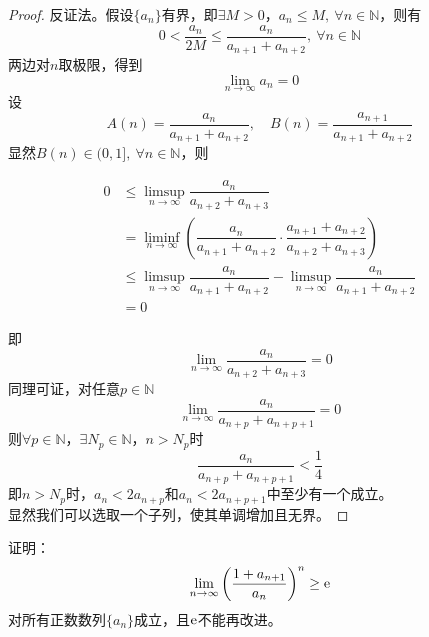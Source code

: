 \begin{proof}
    
    反证法。假设$\{a_n\}$有界，即$\exists M > 0$，$a_n \leq M,\ \forall n \in \mathbb{N}$，则有
    $$0 < \dfrac{a_n}{2M} \leq \dfrac{a_n}{a_{n+1} + a_{n+2}}, \ \forall n \in \mathbb{N}$$
    两边对$n$取极限，得到
    $$\lim\limits_{n\to\infty}{a_n} = 0$$
    设
    $$A(n) = \dfrac{a_n}{a_{n+1} + a_{n+2}}, \quad B(n) = \dfrac{a_{n+1}}{a_{n+1} + a_{n+2}}$$
    显然$B(n) \in (0,1],\  \forall n \in \mathbb{N}$，则
    
    \begin{align*}
        0 & \leq \limsup_{n\to\infty}{\dfrac{a_n}{a_{n+2} + a_{n+3}}} \\
        & = \liminf_{n\to\infty}{\left( \dfrac{a_n}{a_{n+1} + a_{n+2}} \cdot \dfrac{a_{n+1}+a_{n+2}}{a_{n+2} + a_{n+3}} \right)} \\
        & \leq \limsup_{n\to\infty}{\dfrac{a_n}{a_{n+1} + a_{n+2}}} - \limsup_{n\to\infty}{\dfrac{a_n}{a_{n+1} + a_{n+2}}} \\
        & = 0
    \end{align*}
    
    即
    $$\lim\limits_{n\to\infty}{\dfrac{a_n}{a_{n+2} + a_{n+3}}} = 0$$
    同理可证，对任意$p \in \mathbb{N}$
    $$\lim\limits_{n\to\infty}{\dfrac{a_n}{a_{n+p} + a_{n+p+1}}} = 0$$
    则$\forall p \in \mathbb{N}$，$\exists N_p \in \mathbb{N}$，$n > N_p$时
    $$\dfrac{a_n}{a_{n+p} + a_{n+p+1}} < \dfrac{1}{4}$$
    即$n > N_p$时，$a_n < 2a_{n+p}$和$a_n < 2a_{n + p + 1}$中至少有一个成立。\\
    显然我们可以选取一个子列，使其单调增加且无界。
    
\end{proof}

\begin{proposition}

    证明：
    $$\lim\limits_{n\to\infty}{\left( \dfrac{1+a_{n+1}}{a_n} \right)^n} \geq \mathrm{e}$$
    对所有正数数列$\{a_n\}$成立，且$\mathrm{e}$不能再改进。

\end{proposition}

